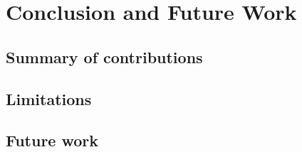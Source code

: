 \chapter{Conclusion and Future Work}
\label{chap:conclusion}

\section{Summary of contributions}

\section{Limitations}

\section{Future work}
